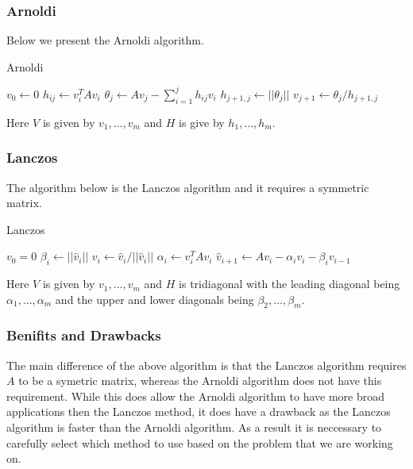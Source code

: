 \subsubsection{Arnoldi}
Below we present the Arnoldi algorithm.
\begin{algorithm}[H]
\caption{Arnoldi \cite{Fan2018}} %
\begin{algorithmic}
\State $v_0 \gets 0$
\State$h_{ij} \gets v_i^T A v_i$
\EndFor
\State$\theta_j \gets Av_j - \sum^j_{i=1} h_{ij}v_i$
\State$h_{j+1,j} \gets ||\theta_j||$
\State$v_{j+1} \gets \theta_j/h_{j+1,j}$
\EndFor
\EndProcedure
\end{algorithmic}
\end{algorithm}
Here $V$ is given by $v_1,...,v_m$ and $H$ is give by $h_1,...,h_m$.\\

\subsubsection{Lanczos}
The algorithm below is the Lanczos algorithm and it requires a symmetric matrix. \cite{Moler2003}
\begin{algorithm}[H]
\caption{Lanczos \cite{OJALVO1970}}
\begin{algorithmic}
\State $v_0 = 0$
\State$\beta_i \gets || \hat v_i ||$
\State$v_i \gets \hat v_i / || \hat v_i ||$
\State$\alpha_i \gets v_i^T A v_i$
\State$\hat v_{i+1} \gets Av_i - \alpha_iv_i - \beta_iv_{i-1}$
\EndFor
\EndProcedure
\end{algorithmic}
\end{algorithm}
Here $V$ is given by ${v_1,...,v_m}$ and $H$ is tridiagonal with the leading diagonal being $\alpha_1, ..., \alpha_m$ and the upper and lower diagonals being $\beta_2,...,\beta_m$.
\subsubsection{Benifits and Drawbacks}
The main difference of the above algorithm is that the Lanczos algorithm requires $A$ to be a symetric matrix, whereas the Arnoldi algorithm does not have this requirement.
While this does allow the Arnoldi algorithm to have more broad applications then the Lanczos method, it does have a drawback as the Lanczos algorithm is faster than the Arnoldi algorithm.
As a result it is neccessary to carefully select which method to use based on the problem that we are working on.

